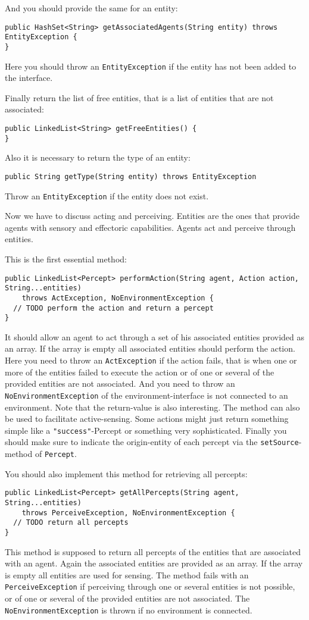 \documentclass[a4]{article}
\begin{document}
And you should provide the same for an entity:
\begin{verbatim}
public HashSet<String> getAssociatedAgents(String entity) throws EntityException {
}
\end{verbatim}
Here you should throw an \texttt{EntityException} if the entity has not been added to the interface.

Finally return the list of free entities, that is a list of entities that are not associated:
\begin{verbatim}
public LinkedList<String> getFreeEntities() {
}
\end{verbatim}

Also it is necessary to return the type of an entity:
\begin{verbatim}
public String getType(String entity) throws EntityException
\end{verbatim}
Throw an \texttt{EntityException} if the entity does not exist.

Now we have to discuss acting and perceiving. Entities are the ones that provide agents with sensory and effectoric
capabilities. Agents act and perceive through entities.

This is the first essential method:
\begin{verbatim}
public LinkedList<Percept> performAction(String agent, Action action, String...entities)
	throws ActException, NoEnvironmentException {
  // TODO perform the action and return a percept
}
\end{verbatim}
It should allow an agent to act through a set of his associated entities provided as an array. If the array is empty
all associated entities should perform the action. Here you need to throw an \texttt{ActException} if the action
fails, that is when one or more of the entities failed to execute the action or of one or several of the provided
entities are not associated. And you need to throw an \texttt{NoEnvironmentException} of the environment-interface
is not connected to an environment. Note that the return-value is also interesting. The method can also be used
to facilitate active-sensing. Some actions might just return something simple like a \texttt{"success"}-Percept or 
something very sophisticated. Finally you should make sure to indicate the origin-entity of each percept via
the \texttt{setSource}-method of \texttt{Percept}.

You should also implement this method for retrieving all percepts:
\begin{verbatim}
public LinkedList<Percept> getAllPercepts(String agent, String...entities) 
    throws PerceiveException, NoEnvironmentException {
  // TODO return all percepts   
}
\end{verbatim}
This method is supposed to return all percepts of the entities that are associated with an agent. 
Again the associated entities are provided as an array. If the array is empty all entities are used for sensing.
The method fails with an \texttt{PerceiveException} if perceiving through one or several entities is not possible,
or of one or several of the provided entities are not associated. The \texttt{NoEnvironmentException} is thrown
if no environment is connected.
\end{document}
